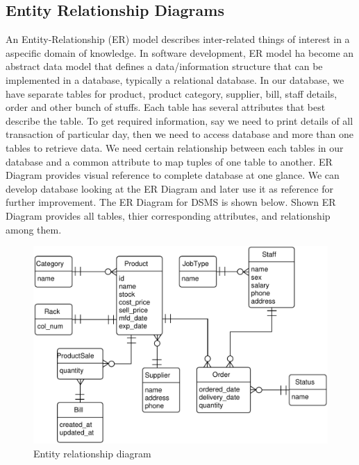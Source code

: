 \subsection{Entity Relationship Diagrams}

An Entity-Relationship (ER) model describes inter-related things of interest in
a aspecific domain of knowledge. In software development, ER model ha become an
abstract data model that defines a data/information structure that can be
implemented in a database, typically a relational database. In our database, we
have separate tables for product, product category, supplier, bill, staff
details, order and other bunch of stuffs. Each table has several attributes
that best describe the table. To get required information, say we need to print
details of all transaction of particular day, then we need to access database
and more than one tables to retrieve data. We need certain relationship between
each tables in our database and a common attribute to map tuples of one table
to another. ER Diagram provides visual reference to complete database at one
glance. We can develop database looking at the ER Diagram and later use it as
reference for further improvement. The ER Diagram for DSMS is shown below.
Shown ER Diagram provides all tables, thier corresponding attributes, and
relationship among them.


\begin{figure}[h]\centering
  \includegraphics[width=\textwidth]{fig/erd}
  \caption{Entity relationship diagram}\label{fig:erd}
\end{figure}
